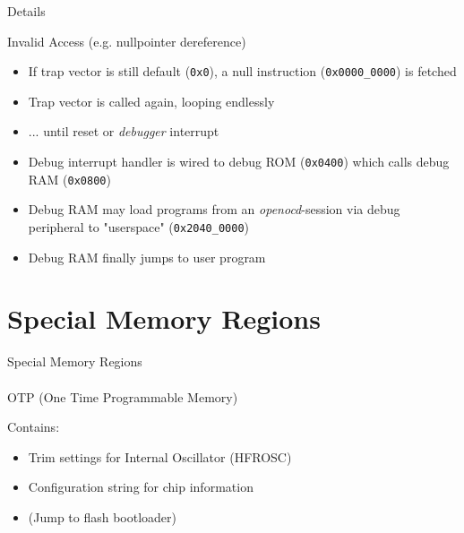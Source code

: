 \documentclass[aspectratio=169]{CPS-Beamer}
\begin{document}
\begin{frame}{Details}
	\begin{block}{Invalid Access (e.g. nullpointer dereference)}
		\begin{itemize}
			\item If trap vector is still default (\texttt{0x0}), a null instruction (\texttt{0x0000\_0000}) is fetched
			\item Trap vector is called again, looping endlessly
			\item ... until reset or \textit{debugger} interrupt
			\item Debug interrupt handler is wired to debug ROM (\texttt{0x0400}) which calls debug RAM (\texttt{0x0800})
			\item Debug RAM may load programs from an \textit{openocd}-session via debug peripheral to "userspace" (\texttt{0x2040\_0000})
			\item Debug RAM finally jumps to user program
		\end{itemize}
	\end{block}
\end{frame}

\section{Special Memory Regions}
\begin{frame}{Special Memory Regions\\~\\OTP (One Time Programmable Memory)}
	\begin{block}{Contains:}
		\begin{itemize}
			\item Trim settings for Internal Oscillator (HFROSC)
			\item Configuration string for chip information
			\item (Jump to flash bootloader)
		\end{itemize}
	\end{block}
\end{frame}
\end{document}

